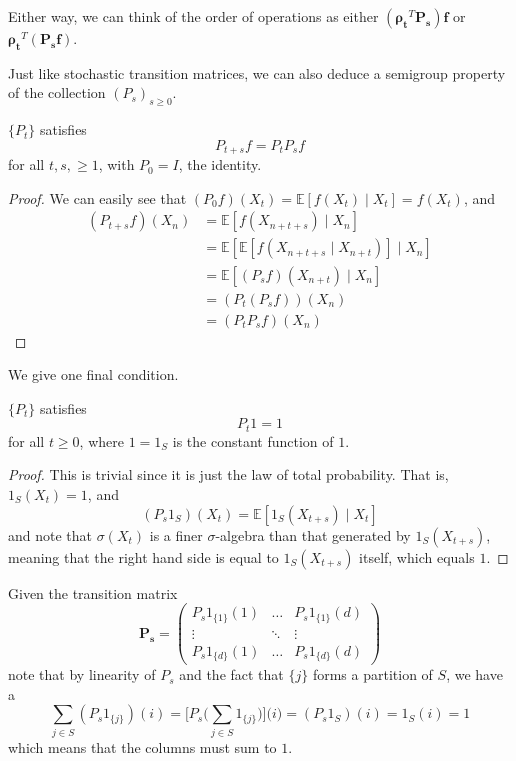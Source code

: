 \documentclass{article}
\begin{document}
  Either way, we can think of the order of operations as either $(\boldsymbol{\rho_t}^T \mathbf{P_s}) \mathbf{f}$ or $\boldsymbol{\rho_t}^T (\mathbf{P_s} \mathbf{f})$. 

  Just like stochastic transition matrices, we can also deduce a semigroup property of the collection $(P_s)_{s \geq 0}$. 

  \begin{lemma}
  $\{P_t\}$ satisfies 
  \[P_{t + s} f = P_t P_s f\]
  for all $t, s, \geq 1$, with $P_0 = I$, the identity. 
  \end{lemma}
  \begin{proof}
  We can easily see that $(P_0 f) (X_t) = \mathbb{E}[f(X_t) \mid X_t] = f(X_t)$, and 
  \begin{align*}
      (P_{t + s} f) (X_n) & = \mathbb{E}[ f(X_{n + t + s}) \mid X_n] \\
      & = \mathbb{E} [ \mathbb{E}[ f(X_{n + t + s} \mid X_{n + t}) ] \mid X_n] \\
      & = \mathbb{E}[(P_s f) (X_{n + t}) \mid X_n] \\
      & = (P_t (P_s f))(X_n) \\
      & = (P_t P_s f) (X_n)
  \end{align*}
  \end{proof}

  We give one final condition. 

  \begin{lemma}[Conservativeness]
  $\{P_t\}$ satisfies 
  \[P_t 1 = 1\]
  for all $t \geq 0$, where $1 = 1_S$ is the constant function of $1$. 
  \end{lemma}
  \begin{proof}
  This is trivial since it is just the law of total probability. That is, $1_S (X_t) = 1$, and 
  \[(P_s 1_S) (X_t) = \mathbb{E}[ 1_S (X_{t + s}) \mid X_t]\]
  and note that $\sigma(X_t)$ is a finer $\sigma$-algebra than that generated by $1_S (X_{t + s})$, meaning that the right hand side is equal to $1_S (X_{t + s})$ itself, which equals $1$. 
  \end{proof}

  \begin{example}
  Given the transition matrix 
  \[\mathbf{P_s} = \begin{pmatrix} P_s 1_{\{1\}} (1) & \ldots & P_s 1_{\{1\}} (d) \\ \vdots & \ddots & \vdots \\ P_s 1_{\{d\}} (1) & \ldots & P_s 1_{\{d\}} (d) \end{pmatrix}\]
  note that by linearity of $P_s$ and the fact that $\{j\}$ forms a partition of $S$, we have a
  \[\sum_{j \in S} (P_s 1_{\{j\}}) (i) = \bigg[ P_s \bigg( \sum_{j \in S} 1_{\{j\}} \bigg) \bigg] \big( i \big) = (P_s 1_S) (i) = 1_S (i) = 1\]
  which means that the columns must sum to $1$. 
  \end{example}
\end{document}

